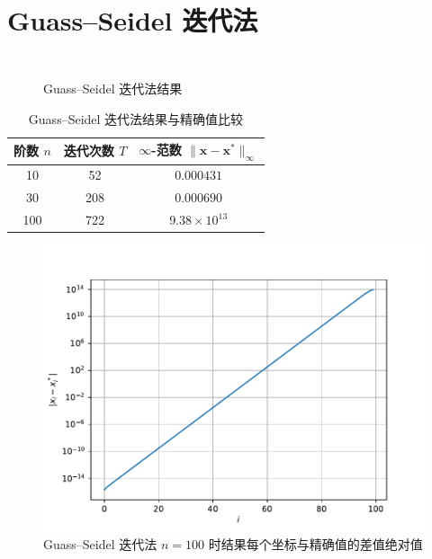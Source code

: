\documentclass{sjtuarticle}
\begin{document}
\section{Guass--Seidel 迭代法}
\label{sec:gs}

\vspace*{-0.5cm}
\inputminted[firstline=186,lastline=211,highlightlines=201-204]{python3}{main.py}
\vspace*{-0.6cm}
\begin{minipage}{0.5\textwidth}
    \begin{figure}[H]
        \centering
        \inputminted[firstline=133,lastline=170,fontsize=\tiny]{text}{stdout.txt}
        \caption{Guass--Seidel 迭代法结果}
    \end{figure}
\end{minipage}
\begin{minipage}{0.45\textwidth}
    \begin{table}[H]
        \centering
        \caption{Guass--Seidel 迭代法结果与精确值比较}
        \begin{tabular}{ccc}
            \toprule
            阶数 $n$ & 迭代次数 $T$ & $\infty$-范数 $\lVert \bm{x}-\bm{x}^* \rVert_\infty$ \\
            \midrule
            10 & 52   & $0.000431$          \\
            30 & 208  & $0.000690$          \\
            100 & 722 & $9.38\times 10^{13}$\\
            \bottomrule
        \end{tabular}
    \end{table}
    \vspace*{-0.75cm}
    \begin{figure}[H]
        \centering
        \includegraphics[width=\textwidth]{pic/GuassSeidelSolver.pdf}
        \caption{Guass--Seidel 迭代法 $n=100$ 时结果每个坐标与精确值的差值绝对值}
    \end{figure}
\end{minipage}
\end{document}

